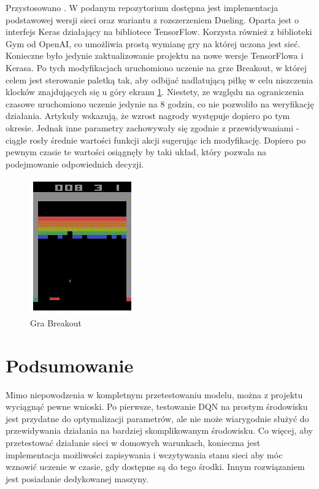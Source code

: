 \documentclass[preprint,12pt]{elsarticle}
\begin{document}
Przystosowano \cite{implementation2}. W podanym repozytorium dostępna jest implementacja podstawowej wersji sieci oraz wariantu z rozszerzeniem Dueling. Oparta jest o interfejs Keras działający na bibliotece TensorFlow. Korzysta również z biblioteki Gym od OpenAI, co umożliwia prostą wymianę gry na której uczona jest sieć. Konieczne było jedynie zaktualizowanie projektu na nowe wersje TensorFlowa i Kerasa. Po tych modyfikacjach uruchomiono uczenie na grze Breakout, w której celem jest sterowanie paletką tak, aby odbijać nadlatującą piłkę w celu niszczenia klocków znajdujących się u góry ekranu \ref{breakout}. Niestety, ze względu na ograniczenia czasowe uruchomiono uczenie jedynie na 8 godzin, co nie pozwoliło na weryfikację działania. Artykuły wskazują, że wzrost nagrody występuje dopiero po tym okresie. Jednak inne parametry zachowywały się zgodnie z przewidywaniami - ciągle rosły średnie wartości funkcji akcji sugerując ich modyfikację. Dopiero po pewnym czasie te wartości osiągnęły by taki układ, który pozwala na podejmowanie odpowiednich decyzji.

\begin{figure}[h]
\centering
\includegraphics[width=0.4\linewidth]{test2.png}
\caption{Gra Breakout}
\label{breakout}
\end{figure}

\section{Podsumowanie}

Mimo niepowodzenia w kompletnym przetestowaniu modelu, można z projektu wyciągnąć pewne wnioski. Po pierwsze, testowanie DQN na prostym środowisku jest przydatne do optymalizacji parametrów, ale nie może wiarygodnie służyć do przewidywania działania na bardziej skomplikowanym środowisku. Co więcej, aby przetestować działanie sieci w domowych warunkach, konieczna jest implementacja możliwości zapisywania i wczytywania stanu sieci aby móc wznowić uczenie w czasie, gdy dostępne są do tego środki. Innym rozwiązaniem jest posiadanie dedykowanej maszyny. 
\end{document}

